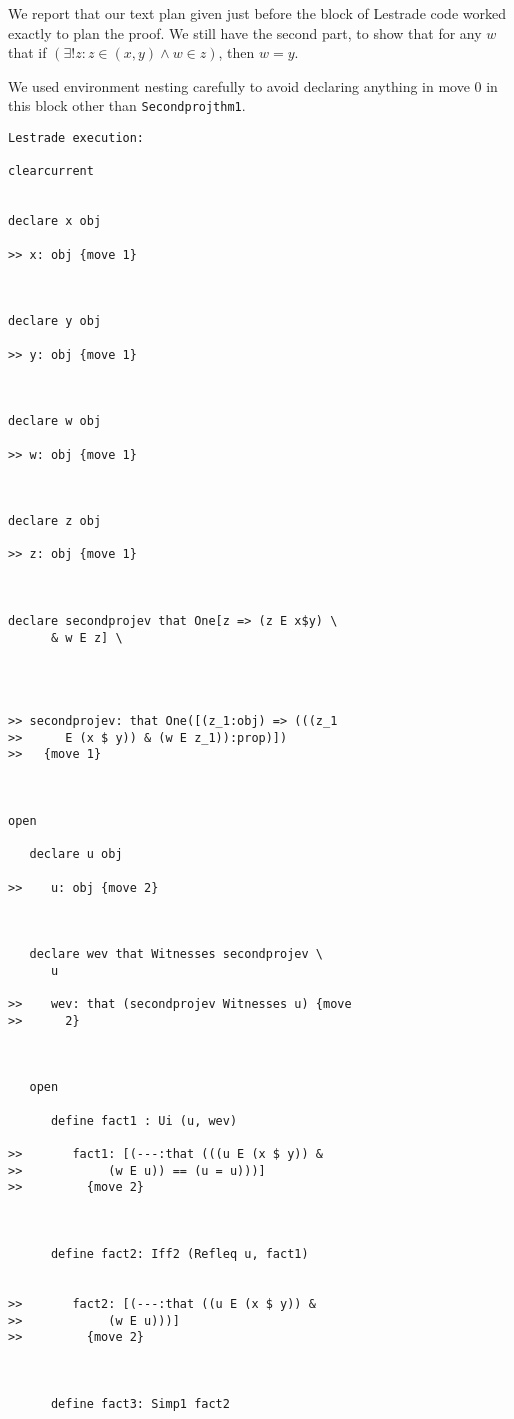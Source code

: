 \documentclass[12pt]{article}
\begin{document}
We report that our text plan given just before the block of Lestrade code worked exactly to plan the proof.  We still have the second part, to show that for any $w$ that if $(\exists! z: z \in (x,y) \wedge w \in z)$, then $w=y$.

We used environment nesting carefully to avoid declaring anything in move 0 in this block other than {\tt Secondprojthm1}.

\begin{verbatim}Lestrade execution:

clearcurrent


declare x obj

>> x: obj {move 1}



declare y obj

>> y: obj {move 1}



declare w obj

>> w: obj {move 1}



declare z obj

>> z: obj {move 1}



declare secondprojev that One[z => (z E x$y) \
      & w E z] \
   



>> secondprojev: that One([(z_1:obj) => (((z_1
>>      E (x $ y)) & (w E z_1)):prop)])
>>   {move 1}



open

   declare u obj

>>    u: obj {move 2}



   declare wev that Witnesses secondprojev \
      u

>>    wev: that (secondprojev Witnesses u) {move
>>      2}



   open

      define fact1 : Ui (u, wev)

>>       fact1: [(---:that (((u E (x $ y)) &
>>            (w E u)) == (u = u)))]
>>         {move 2}



      define fact2: Iff2 (Refleq u, fact1)


>>       fact2: [(---:that ((u E (x $ y)) &
>>            (w E u)))]
>>         {move 2}



      define fact3: Simp1 fact2


\end{verbatim}
\end{document}
